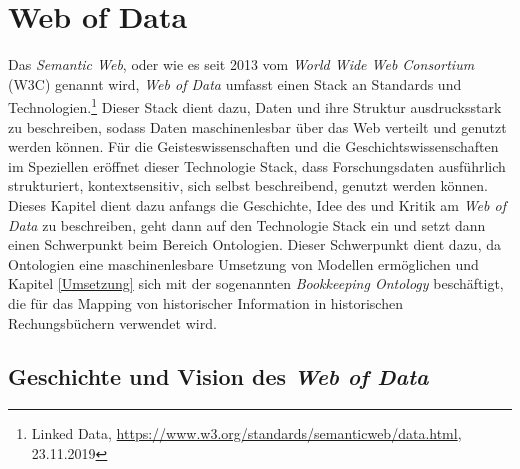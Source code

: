 \documentclass[12pt,a4paper]{article}
\begin{document}
\newpage
\section{Web of Data}
\label{WebofData}
Das \textit{Semantic Web}, oder wie es seit 2013 vom \textit{World Wide Web Consortium} (W3C) genannt wird, \textit{Web of Data} umfasst einen Stack an Standards und Technologien.\footnote{Linked Data, \url{https://www.w3.org/standards/semanticweb/data.html}, 23.11.2019} Dieser Stack dient dazu, Daten und ihre Struktur ausdrucksstark zu beschreiben, sodass Daten maschinenlesbar über das Web verteilt und genutzt werden können. Für die Geisteswissenschaften und die Geschichtswissenschaften im Speziellen eröffnet dieser Technologie Stack, dass Forschungsdaten ausführlich strukturiert, kontextsensitiv, sich selbst beschreibend, genutzt werden können.
\\
Dieses Kapitel dient dazu anfangs die Geschichte, Idee des und Kritik am \textit{Web of Data} zu beschreiben, geht dann auf den Technologie Stack ein und setzt dann einen Schwerpunkt beim Bereich Ontologien. Dieser Schwerpunkt dient dazu, da Ontologien eine maschinenlesbare Umsetzung von Modellen ermöglichen und Kapitel \ref{Umsetzung} sich mit der sogenannten \textit{Bookkeeping Ontology} beschäftigt, die für das Mapping von historischer Information in historischen Rechungsbüchern verwendet wird.  

\subsection{Geschichte und Vision des \textit{Web of Data}}
\end{document}
